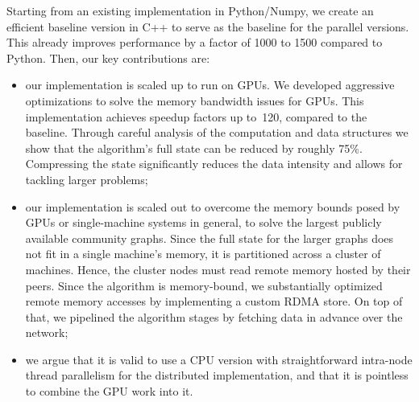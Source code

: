 Starting from an existing implementation in Python/Numpy, we create an efficient
baseline version in C++ to serve as the baseline for the parallel versions.
This already improves performance by a factor of 1000 to 1500 compared to
Python. Then, our key contributions are:
\begin{itemize}
\item
our implementation is scaled up to run on GPUs.
We developed aggressive optimizations to solve the memory bandwidth issues for
GPUs. This implementation achieves speedup factors up to~120,
compared to the baseline.
%
Through careful analysis of the computation and data structures we show that
the algorithm's full state can be reduced by roughly 75\%. Compressing the
state significantly reduces the data intensity and allows for tackling larger
problems; %

\item
our implementation is scaled out to overcome the memory bounds posed by GPUs or
single-machine systems in general, to solve the largest publicly available
community graphs. %
Since the full state for the larger graphs does not fit in a
single machine's memory, it is partitioned across a cluster
of machines. Hence, the cluster nodes must read
remote memory hosted by their peers. Since the algorithm is memory-bound, we
substantially optimized remote memory accesses by implementing
a custom RDMA store.
On top of that, we pipelined the algorithm stages by fetching
data in advance over the network;
\begin{comment} Finally, the algorithm's computation
is effectively distributed across the cluster nodes and parallelized further
within each node by exploiting their multi-core CPUs.
\end{comment}

\item we argue that it is valid to use a CPU version with straightforward
intra-node thread parallelism for the distributed implementation, and
that it is pointless to combine the GPU work into it.

\end{itemize}

